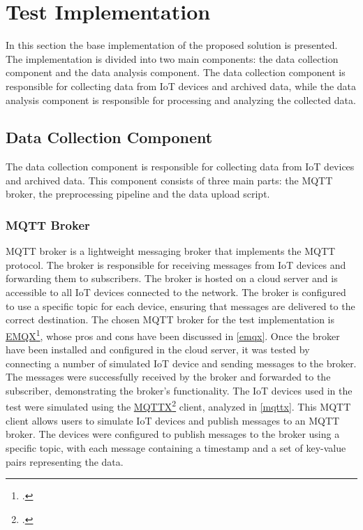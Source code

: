 \section{Test Implementation}

In this section the base implementation of the proposed solution is presented. The implementation is divided into two main components: the data collection component and the data analysis component. The data collection component is responsible for collecting data from IoT devices and archived data, while the data analysis component is responsible for processing and analyzing the collected data.

\subsection{Data Collection Component}

The data collection component is responsible for collecting data from IoT devices and archived data. This component consists of three main parts: the MQTT broker, the preprocessing pipeline and the data upload script.

\subsubsection{MQTT Broker}
MQTT broker is a lightweight messaging broker that implements the MQTT protocol. The broker is responsible for receiving messages from IoT devices and forwarding them to subscribers. The broker is hosted on a cloud server and is accessible to all IoT devices connected to the network. The broker is configured to use a specific topic for each device, ensuring that messages are delivered to the correct destination. 
The chosen MQTT broker for the test implementation is \href{https://www.emqx.io/}{EMQX}\footcite{site:emqx}, whose pros and cons have been discussed in \ref{emqx}.
Once the broker have been installed and configured in the cloud server, it was tested by connecting a number of simulated IoT device and sending messages to the broker. The messages were successfully received by the broker and forwarded to the subscriber, demonstrating the broker's functionality.
The IoT devices used in the test were simulated using the \href{https://mqttx.app/}{MQTTX}\footcite{site:mqttx} client, analyzed in \ref{mqttx}. This MQTT client allows users to simulate IoT devices and publish messages to an MQTT broker. The devices were configured to publish messages to the broker using a specific topic, with each message containing a timestamp and a set of key-value pairs representing the data.

